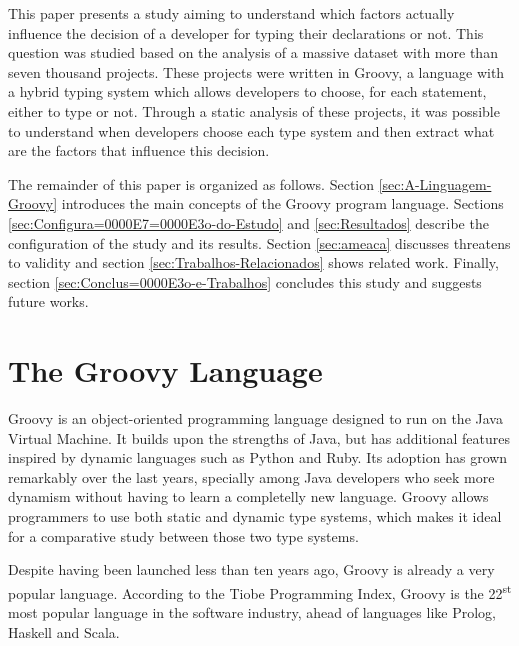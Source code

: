 \documentclass[preprint]{sigplanconf}
\begin{document}
This paper presents a study aiming to understand which factors actually influence the decision of a developer for typing their declarations or not. 
This question was studied based on the analysis of a massive dataset with more than seven thousand projects.
These projects were written in Groovy, a language with a hybrid typing system which allows developers to choose, for each statement, either to type or not.
Through a static analysis of these projects, it was possible to understand when developers choose each type system and then extract what are the factors that influence this decision.

The remainder of this paper is organized as follows. 
Section \ref{sec:A-Linguagem-Groovy} introduces the main concepts of the Groovy program language. 
Sections \ref{sec:Configura=0000E7=0000E3o-do-Estudo} and \ref{sec:Resultados} describe the configuration of the study and its results. 
Section \ref{sec:ameaca} discusses threatens to validity and section \ref{sec:Trabalhos-Relacionados} shows related work. 
Finally, section  \ref{sec:Conclus=0000E3o-e-Trabalhos} concludes this study and suggests future works.















%
%

\section{The Groovy Language\label{sec:A-Linguagem-Groovy}}
Groovy is an object-oriented programming language designed to run on the Java Virtual Machine.
It builds upon the strengths of Java, but has additional features inspired by dynamic languages such as Python and Ruby.
Its adoption has grown remarkably over the last years, specially among Java developers who seek more dynamism without having to learn a completelly new language.
Groovy allows programmers to use both static and dynamic type systems, which makes it ideal for a comparative study between those two type systems.

Despite having been launched less than ten years ago, Groovy is already a very popular language.
According to the Tiobe Programming Index, Groovy is the 22\textsuperscript{st} most popular language in the software industry\cite{tiobe}, ahead of languages like Prolog, Haskell and Scala. 
\end{document}
